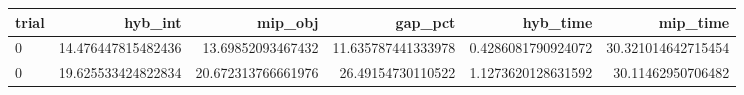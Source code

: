 \begin{tabular}{lrrrrr}
\hline
trial & hyb_int & mip_obj & gap_pct & hyb_time & mip_time \\ \hline
0 & 14.476447815482436 & 13.69852093467432 & 11.635787441333978 & 0.4286081790924072 & 30.321014642715454 \\
0 & 19.625533424822834 & 20.672313766661976 & 26.49154730110522 & 1.1273620128631592 & 30.11462950706482 \\
\hline
\end{tabular}
